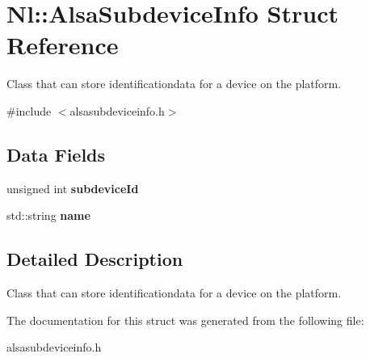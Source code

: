 \hypertarget{structNl_1_1AlsaSubdeviceInfo}{\section{Nl\-:\-:Alsa\-Subdevice\-Info Struct Reference}
\label{structNl_1_1AlsaSubdeviceInfo}
}


Class that can store identificationdata for a device on the platform.  




{\ttfamily \#include $<$alsasubdeviceinfo.\-h$>$}

\subsection*{Data Fields}
\begin{DoxyCompactItemize}
\item 
\hypertarget{structNl_1_1AlsaSubdeviceInfo_a6fd7482c128981651fec883f8414c773}{unsigned int {\bfseries subdevice\-Id}}\label{structNl_1_1AlsaSubdeviceInfo_a6fd7482c128981651fec883f8414c773}

\item 
\hypertarget{structNl_1_1AlsaSubdeviceInfo_a157d3895b4fddc7b612e43d699b431e4}{std\-::string {\bfseries name}}\label{structNl_1_1AlsaSubdeviceInfo_a157d3895b4fddc7b612e43d699b431e4}

\end{DoxyCompactItemize}


\subsection{Detailed Description}
Class that can store identificationdata for a device on the platform. 

The documentation for this struct was generated from the following file\-:\begin{DoxyCompactItemize}
\item 
alsasubdeviceinfo.\-h\end{DoxyCompactItemize}
